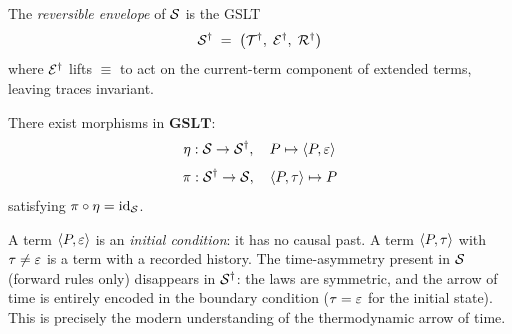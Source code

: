 \begin{definition}
The \emph{reversible envelope} of $\mathcal{S}$ is the GSLT
\[
  \mathcal{S}^\dagger \;=\; \bigl(\mathcal{T}^\dagger,\; \mathcal{E}^\dagger,\; \mathcal{R}^\dagger\bigr)
\]
where $\mathcal{E}^\dagger$ lifts $\equiv$ to act on the current-term component of
extended terms, leaving traces invariant.
\end{definition}

\begin{proposition}
There exist morphisms in $\mathbf{GSLT}$:
\[
  \eta : \mathcal{S} \to \mathcal{S}^\dagger, \quad P \mapsto \langle P, \varepsilon \rangle
\]
\[
  \pi : \mathcal{S}^\dagger \to \mathcal{S}, \quad \langle P, \tau \rangle \mapsto P
\]
satisfying $\pi \circ \eta = \mathrm{id}_{\mathcal{S}}$.
\end{proposition}

\begin{remark}
A term $\langle P, \varepsilon \rangle$ is an \emph{initial condition}: it has no causal
past.  A term $\langle P, \tau \rangle$ with $\tau \neq \varepsilon$ is a term with a
recorded history.  The time-asymmetry present in $\mathcal{S}$ (forward rules only)
disappears in $\mathcal{S}^\dagger$: the laws are symmetric, and the arrow of time is
entirely encoded in the boundary condition ($\tau = \varepsilon$ for the initial
state).  This is precisely the modern understanding of the thermodynamic arrow
of time.
\end{remark}

